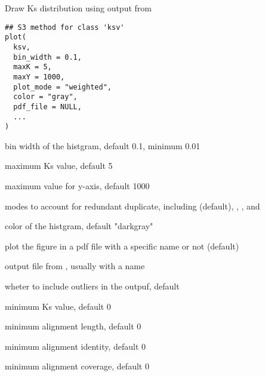 \documentclass[a4paper]{book}
\begin{document}
%
\begin{Description}\relax
Draw Ks distribution using output from 
\end{Description}
%
\begin{Usage}
\begin{verbatim}
## S3 method for class 'ksv'
plot(
  ksv,
  bin_width = 0.1,
  maxK = 5,
  maxY = 1000,
  plot_mode = "weighted",
  color = "gray",
  pdf_file = NULL,
  ...
)
\end{verbatim}
\end{Usage}
%
\begin{Arguments}
\begin{ldescription}
\item[\code{bin\_width}] bin width of the histgram, default 0.1, minimum 0.01

\item[\code{maxK}] maximum Ks value, default 5

\item[\code{maxY}] maximum value for y-axis, default 1000

\item[\code{plot\_mode}] modes to account for redundant duplicate, including  (default), , , and 

\item[\code{color}] color of the histgram, default "darkgray"

\item[\code{pdf\_file}] plot the figure in a pdf file with a specific name or not  (default)

\item[\code{file}]  output file from , usually with a name 

\item[\code{include.outliers}] wheter to include outliers in the  outpuf, default 

\item[\code{minK}] minimum Ks value, default 0

\item[\code{minAlnLen}] minimum alignment length, default 0

\item[\code{minIdn}] minimum alignment identity, default 0

\item[\code{minCov}] minimum alignment coverage, default 0
\end{ldescription}
\end{Arguments}
\end{document}
